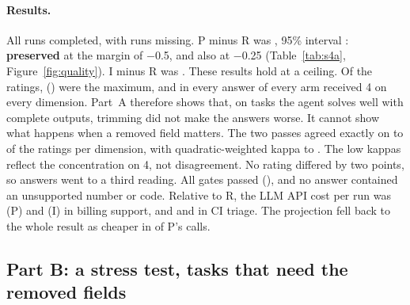 \begin{table}[t]
\centering\small

\caption{Study~4A, judged composite (0--4): P minus R and I minus R on \SfourATasks{} held-out tasks, cases weighted
equally, 95\% bootstrap intervals over tasks. On CI triage every answer of every arm received the maximum.}
\label{tab:s4a}
\end{table}

\paragraph{Results.} All \SfourARuns{} runs completed, with \SfourAMissing{} runs missing. P minus R was
\SfourAPoint{}, 95\% interval \SfourACI{}: \textbf{preserved} at the margin of $-$0.5, and also at $-$0.25
(Table~\ref{tab:s4a}, Figure~\ref{fig:quality}).
I minus R was \SfourIPoint{} \SfourICI{}. These results hold at a ceiling. Of the \SfourARatings{} ratings,
\SfourARatingsFour{} (\SfourACeiling) were the maximum, and in \SfourACeilingCase{} every answer of every arm
received 4 on every dimension. Part~A therefore shows that, on tasks the agent solves well with complete outputs,
trimming did not make the answers worse. It cannot show what happens when a removed field matters. The two passes
agreed exactly on \SfourAExactMin{} to \SfourAExactMax{} of the ratings per dimension, with quadratic-weighted kappa
\SfourAKappaMin{} to \SfourAKappaMax{}. The low kappas reflect the concentration on 4, not disagreement. No rating
differed by two points, so \SfourAAdjudicated{} answers went to a third reading. All gates passed
(\SfourAGates{}), and no answer contained an unsupported number or code. Relative to R, the LLM API cost per run
was \SfourACostPiv{} (P) and \SfourACostIiv{} (I) in billing support, and \SfourACostPv{} and \SfourACostIv{} in CI
triage. The projection fell back to the whole result as cheaper in \SfourAFullCheaper{} of P's calls.

\subsection{Part B: a stress test, tasks that need the removed fields}
\label{sec:s4b}

